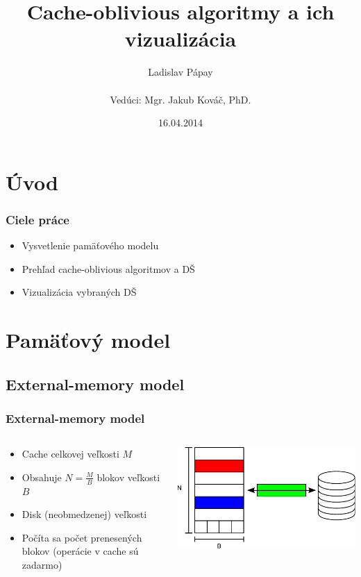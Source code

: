 \documentclass{beamer}
\title{Cache-oblivious algoritmy a ich vizualizácia}
\author[Ladislav Pápay]{Ladislav Pápay \\ ~ \\ Vedúci: Mgr. Jakub Kováč, PhD.}
\date{16.04.2014}
\begin{document}
\frame{\titlepage}

\section{Úvod}
\begin{frame}
    \frametitle{Ciele práce}
    \begin{itemize}
        \item Vysvetlenie pamäťového modelu
        \item Prehľad cache-oblivious algoritmov a DŠ
        \item Vizualizácia vybraných DŠ
    \end{itemize}
\end{frame}

\section{Pamäťový model}
\subsection{External-memory model}
\begin{frame}
    \frametitle{External-memory model}
	\begin{columns}[T]
		\begin{column}{.4\textwidth}
			\begin{itemize}
				\item Cache celkovej veľkosti $M$
				\item Obsahuje $N = \frac{M}{B}$ blokov veľkosti $B$
				\item Disk (neobmedzenej) veľkosti
				\item Počíta sa počet prenesených blokov (operácie v cache sú zadarmo)
			\end{itemize}
		\end{column}
		\begin{column}{.6\textwidth}\raggedleft
			\includegraphics[scale=0.75]{../figures/external_memory_inkscape/drawing.pdf} 
		\end{column}
	\end{columns}
\end{frame}
\end{document}
